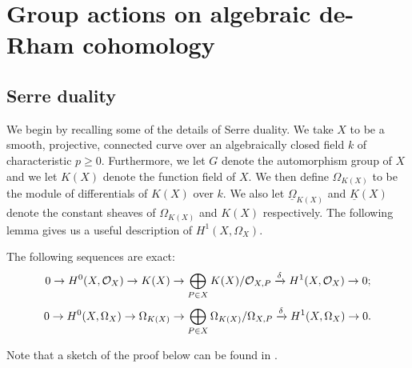 \chapter{Group actions on algebraic de-Rham cohomology} \label{Chapter:De-Rham cohomology}


\section{Serre duality}


We begin by recalling some of the details of Serre duality.
We take $X$ to be a smooth, projective, connected curve over an algebraically closed field $k$ of characteristic $p \geq 0$.
Furthermore, we let $G$ denote the automorphism group of $X$ and we let $K(X)$ denote the function field of $X$.
We then define $\Omega_{K(X)}$ to be the module of differentials of $K(X)$ over $k$.
We also let $\underline{\Omega}_{K(X)}$ and $\underline{K}(X)$ denote the constant sheaves of $\Omega_{K(X)}$ and $K(X)$ respectively.
The following lemma gives us a useful description of $H^1(X,\Omega_X)$.
    \begin{lem}\label{exactsequencelemma}
    The following sequences are exact:
        \begin{equation}\label{dualitysesfunctions}
        0 \rightarrow H^0(X,{\cal O}_X) \rightarrow K(X) \rightarrow \bigoplus_{P \in X} K(X)/{\cal O}_{X,P} \xrightarrow{\delta} H^1(X,\mathcal{O}_X) \rightarrow  0;
        \end{equation}
        \begin{equation}\label{dualitysesdifferentials}
        0 \rightarrow {H^0(X,\Omega_X)} \rightarrow \Omega_{K(X)} \rightarrow \bigoplus_{P \in X}\Omega_{K(X)}/\Omega_{X,P} \xrightarrow{\delta} H^1(X,\Omega_X) \rightarrow 0.
        \end{equation}
    \end{lem}
    \begin{rem}
        Note that a sketch of the proof below can be found in \cite[pg. 248]{hart}.
        \end{rem}
